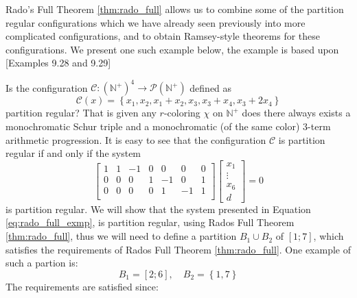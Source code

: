 Rado's Full Theorem \ref{thm:rado_full} allows us to combine some of the partition regular configurations which we have already seen previously into more complicated configurations, and to obtain Ramsey-style theorems for these configurations. We present one such example below, the example is based upon \cite{rtoi}[Examples 9.28 and 9.29]
\begin{example}\label{exmp:rado_full_theorem_yields_combination}
	Is the configuration $\mathcal{C}: (\mathbb{N}^{+})^{4} \to \mathcal{P}(\mathbb{N}^{+})$ defined as
	\begin{equation*}
		\mathcal{C}(x) = \left\{x_1, x_2, x_1 + x_2, x_3, x_3 + x_{4}, x_3 + 2x_{4}\right\}
	\end{equation*}
	partition regular? That is given any $r$-coloring $\chi$ on $\mathbb{N}^{+}$ does there always exists a monochromatic Schur triple and a monochromatic (of the same color) $3$-term arithmetic progression.
	It is easy to see that the configuration $\mathcal{C}$ is partition regular if and only if the system
	\begin{equation}\label{eq:rado_full_exmp}
		\begin{bmatrix}
			1 & 1 & -1 & 0 & 0  & 0  & 0 \\
			0 & 0 & 0  & 1 & -1 & 0  & 1 \\
			0 & 0 & 0  & 0 & 1  & -1 & 1 \\
		\end{bmatrix} \begin{bmatrix} x_1 \\ \vdots \\ x_6 \\ d \end{bmatrix} = 0
	\end{equation}
	is partition regular. We will show that the system presented in Equation \eqref{eq:rado_full_exmp}, is partition regular, using Rados Full Theorem \ref{thm:rado_full}, thus we will need to define a partition $B_1 \cup B_2$ of $[1; 7]$, which satisfies the requirements of Rados Full Theorem \ref{thm:rado_full}. One example of such a partion is:
	\begin{equation*}
		B_1 = [2; 6], \quad B_2 = \left\{1, 7\right\}
	\end{equation*}
	The requirements are satisfied since:
	\begin{equation*}

\end{equation*}
\end{example}
